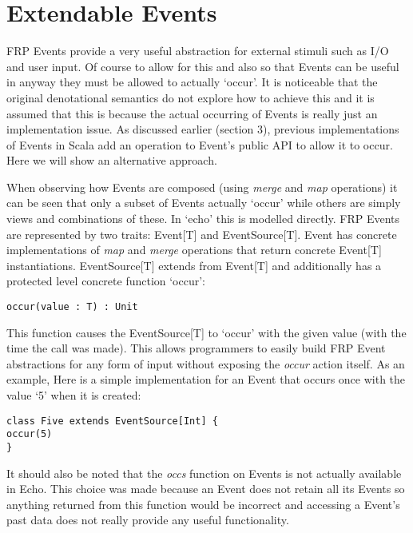   \section{Extendable Events}
    FRP Events provide a very useful abstraction for external stimuli such as I/O and user input. Of course
    to allow for this and also so that Events can be useful in anyway they must be allowed to actually `occur'.
    It is noticeable that the original denotational semantics \cite{Elliott1997} do not explore how to achieve
    this and it is assumed that this is because the actual occurring of Events is really just an implementation
    issue. As discussed earlier (section 3), previous implementations of Events in Scala add an operation to Event's
    public API to allow it to occur. Here we will show an alternative approach.
    
    When observing how Events are composed (using \emph{merge} and \emph{map} operations) it can be seen that
    only a subset of Events actually `occur' while others are simply views and combinations of these.
    In `echo' this is modelled directly. FRP Events are represented by two traits: Event[T] and EventSource[T].
    Event has concrete implementations of \emph{map} and \emph{merge} operations that
    return concrete Event[T] instantiations. EventSource[T] extends
    from Event[T] and additionally has a protected level concrete function `occur':
    
\begin{verbatim}
occur(value : T) : Unit
\end{verbatim}  

    This function causes the EventSource[T] to `occur' with the given value (with the time the call was made). This allows 
    programmers
    to easily build FRP Event abstractions for any form of input without exposing the \emph{occur} action itself.
    As an example, Here is a simple implementation for an Event that occurs once with the value `5' when it 
    is created:
    
\begin{verbatim}
class Five extends EventSource[Int] {
occur(5)
}
\end{verbatim}

    It should also be noted that the \emph{occs} function on Events is not actually available in Echo. This
    choice was made because an Event does not retain all its Events so anything returned from this 
    function would be incorrect and accessing a Event's past data does not really
    provide any useful functionality.

